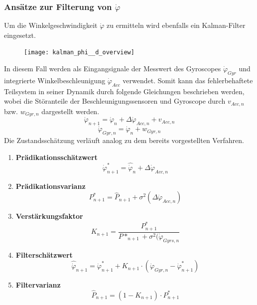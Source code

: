 \subsubsection{Ansätze zur Filterung von $\dot{\varphi}$}
Um die Winkelgeschwindigkeit $\dot{\varphi}$ zu ermitteln wird ebenfalls ein Kalman-Filter eingesetzt.
 
\begin{figure}[H]
\centering
\texttt{[image: kalman\_phi\_\_d\_overview]}
\vspace*{-\baselineskip}
\end{figure}

In diesem Fall werden als Eingangsignale der Messwert des Gyroscopes $\dot{\varphi}_{Gyr}$ und integrierte Winkelbeschleunigung $\dot{\varphi}_{Acc}$ verwendet. Somit kann das fehlerbehaftete Teilsystem in seiner Dynamik durch folgende Gleichungen beschrieben werden, wobei die Störanteile der Beschleunigungssensoren und Gyroscope durch $v_{Acc,n}$ bzw. $w_{Gyr,n}$ dargestellt werden.
\begin{equation}
\dot{\varphi}_{n+1} = \dot{\varphi}_n + \Delta \dot{\varphi}_{Acc,n} + v_{Acc,n}
\end{equation}
\begin{equation}
\dot{\varphi}_{Gyr,n} = \dot{\varphi}_n + w_{Gyr,n}
\end{equation}
Die Zustandsschätzung verläuft analog zu dem bereits vorgestellten Verfahren.
\begin{enumerate}
\item \textbf{Prädikationsschätzwert}
\begin{equation}
\dot{\varphi}^*_{n+1} = \hat{\dot{\varphi}}_n + \Delta \dot{\varphi}_{Acc,n}
\end{equation}
\item \textbf{Prädikationsvarianz}
\begin{equation}
P^*_{n+1} = \hat{P}_{n+1} + \sigma^2(\Delta \dot{\varphi}_{Acc,n})
\end{equation}
\item \textbf{Verstärkungsfaktor}
\begin{equation}
K_{n+1} = \frac{P^*_{n+1}}{P*_{n+1} + \sigma^2(\dot{\varphi}_{Gyrs,n}}
\end{equation}
\item \textbf{Filterschätzwert}
\begin{equation}
\hat{\dot{\varphi}}_{n+1} = \dot{\varphi}^*_{n+1} + K_{n+1} \cdot (\dot{\varphi}_{Gyr,n} - \dot{\varphi}^*_{n+1})
\end{equation}
\item \textbf{Filtervarianz}
\begin{equation}
\hat{P}_{n+1} = (1-K_{n+1}) \cdot P^*_{n+1}
\end{equation}
\end{enumerate}
